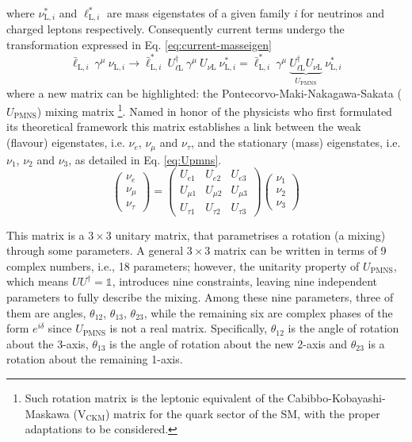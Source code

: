 where $\nu_{\text{L}, i}^*$ and $\ell_{\text{L}, i}^*$ are mass eigenstates of a given family \textit{i} for neutrinos and charged leptons respectively.
Consequently current terms undergo the transformation expressed in Eq. \ref{eq:current-masseigen}
\begin{equation}
    \label{eq:current-masseigen}
    \bar{\ell}_{\text{L}, i}~\gamma^{\mu}~\nu_{\text{L}, i} \longrightarrow \bar{\ell}_{\text{L}, i}^*~ U_{\ell \text{L}}^\dagger~\gamma^{\mu}~U_{\nu \text{L}}~\nu_{\text{L}, i}^* = \bar{\ell}_{\text{L}, i}^*~\gamma^{\mu}~\underbrace{U_{\ell \text{L}}^\dagger U_{\nu \text{L}}}_{U_{\text{PMNS}}}~\nu_{\text{L}, i}^* 
\end{equation}
where a new matrix can be highlighted: the Pontecorvo-Maki-Nakagawa-Sakata ($U_\text{PMNS}$) mixing matrix
\footnote{Such rotation matrix is the leptonic equivalent of the Cabibbo-Kobayashi-Maskawa (V$_\text{CKM}$) 
matrix for the quark sector of the SM, with the proper adaptations to be considered.}. 
Named in honor of the physicists who first formulated its theoretical framework \cite{Pontecorvo1957, Pontecorvo1967, Maki1962} 
this matrix establishes a link between the weak (flavour) eigenstates, i.e. $\nu_e$, $\nu_\mu$ and $\nu_\tau$, 
and the stationary (mass) eigenstates, i.e. $\nu_1$, $\nu_2$ and $\nu_3$,
as detailed in Eq. \ref{eq:Upmns}. 
\begin{equation}
    \label{eq:Upmns}
    \begin{pmatrix}
    \nu_e \\
    \nu_\mu \\
    \nu_\tau
    \end{pmatrix}
    =
    \begin{pmatrix}
    U_{e1} & U_{e2} & U_{e3} \\
    U_{\mu1} & U_{\mu2} & U_{\mu3} \\
    U_{\tau1} & U_{\tau2} & U_{\tau3}
    \end{pmatrix}
    \begin{pmatrix}
    \nu_1 \\
    \nu_2 \\
    \nu_3
\end{pmatrix}
\end{equation}

This matrix is a $3 \times 3$ unitary matrix, that parametrises a rotation (a mixing) through some parameters. 
A general $3 \times 3$ matrix can be written in terms of 9 complex numbers, i.e., 18 parameters; 
however, the unitarity property of $U_{\text{PMNS}}$, which means $U U^\dagger = \mathbb{1}$, introduces nine constraints, 
leaving nine independent parameters to fully describe the mixing. Among these nine parameters, three of them are angles, 
$\theta_{12}$, $\theta_{13}$, $\theta_{23}$, while the remaining six are complex phases of the form $e^{i \delta}$ 
since $U_{\text{PMNS}}$ is not a real matrix. Specifically, $\theta_{12}$ is the angle of rotation about the 3-axis, 
$\theta_{13}$ is the angle of rotation about the new 2-axis and $\theta_{23}$ is a rotation about the remaining 1-axis.

